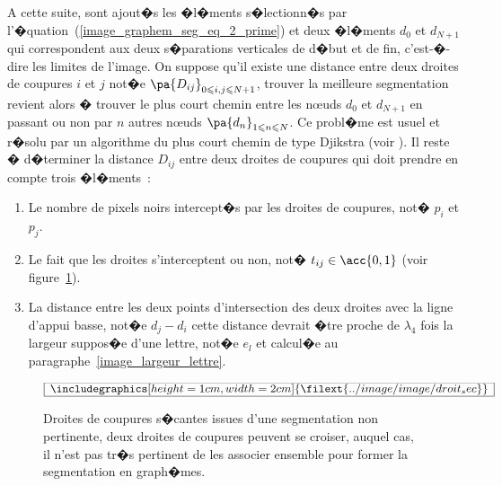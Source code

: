 A cette suite, sont ajout�s les �l�ments s�lectionn�s par l'�quation~(\ref{image_graphem_seg_eq_2_prime}) et deux �l�ments $d_0$ et $d_{N+1}$ qui correspondent aux deux s�parations verticales de d�but et de fin, c'est-�-dire les limites de l'image. On suppose qu'il existe une distance entre deux droites de coupures $i$ et $j$ not�e $\pa{D_{ij}}_{ 0 \leqslant i,j \leqslant N+1 }$, trouver la meilleure segmentation revient alors � trouver le plus court chemin entre les n\oe uds $d_0$ et $d_{N+1}$ en passant ou non par $n$ autres n\oe uds $\pa{d_n}_{ 1 \leqslant n \leqslant N }$. Ce probl�me est usuel et r�solu par un algorithme du plus court chemin de type Djikstra (voir ). Il reste � d�terminer la distance $D_{ij}$ entre deux droites de coupures qui doit prendre en compte trois �l�ments~:


        \begin{enumerate}
        \item Le nombre de pixels noirs intercept�s par les droites de coupures, not� $p_i$ et $p_j$.
        \item Le fait que les droites s'interceptent ou non, not� $t_{ij} \in \acc{0,1}$ 
                        (voir figure~\ref{image_droite_coupure_croisees}).
        \item La distance entre les deux points d'intersection des deux droites avec la ligne d'appui basse, 
                        not�e $d_j - d_i$ cette distance devrait �tre proche de 
                        $\lambda_4$ fois la largeur suppos�e d'une lettre, not�e $e_l$ et calcul�e au 
                        paragraphe~\ref{image_largeur_lettre}.
        \end{enumerate}
        


            \begin{figure}[ht]
        $$\frame{$\begin{array}[c]{c}\includegraphics[height=1cm, width=2cm]
        {\filext{../image/image/droit_sec}}\end{array}$}$$
        \caption{    Droites de coupures s�cantes issues d'une segmentation non pertinente, 
                            deux droites de coupures peuvent se croiser, auquel cas, 
                            il n'est pas tr�s pertinent de les associer ensemble pour former la segmentation en graph�mes. }
        \label{image_droite_coupure_croisees}
            \end{figure}

